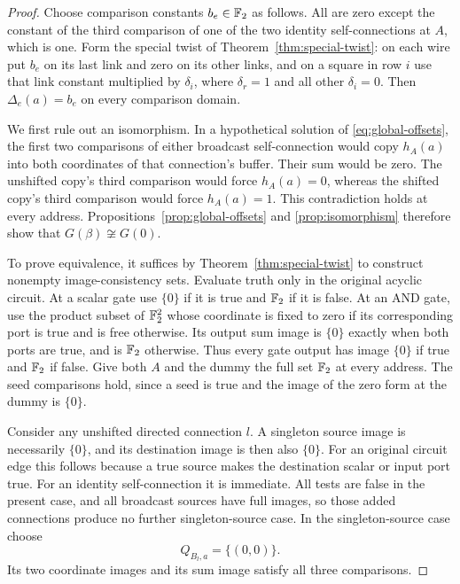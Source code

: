 \begin{proof}
Choose comparison constants \(b_e\in\mathbb F_2\) as follows.  All are zero except
the constant of the third comparison of one of the two identity
self-connections at \(A\), which is one.  Form the special twist of
Theorem~\ref{thm:special-twist}: on each wire put \(b_e\) on its last link
and zero on its other links, and on a square in row \(i\) use that link
constant multiplied by \(\delta_i\), where \(\delta_r=1\) and all other
\(\delta_i=0\).  Then \(\Delta_e(a)=b_e\) on every comparison domain.

We first rule out an isomorphism.  In a hypothetical solution of
\eqref{eq:global-offsets}, the first two comparisons of either broadcast
self-connection would copy \(h_A(a)\) into both coordinates of that
connection's buffer.  Their sum would be zero.  The unshifted copy's third
comparison would force \(h_A(a)=0\), whereas the shifted copy's third
comparison would force \(h_A(a)=1\).  This contradiction holds at every
address.  Propositions~\ref{prop:global-offsets} and
\ref{prop:isomorphism} therefore show that \(G(\beta)\not\cong G(0)\).

To prove equivalence, it suffices by Theorem~\ref{thm:special-twist} to
construct nonempty image-consistency sets.  Evaluate truth only in the
original acyclic circuit.  At a scalar gate use \(\{0\}\) if it is true
and \(\mathbb F_2\) if it is false.  At an AND gate, use the product subset of
\(\mathbb F_2^2\) whose coordinate is fixed to zero if its corresponding port is
true and is free otherwise.  Its output sum image is \(\{0\}\) exactly
when both ports are true, and is \(\mathbb F_2\) otherwise.  Thus every gate output
has image \(\{0\}\) if true and \(\mathbb F_2\) if false.  Give both \(A\) and
the dummy the full set \(\mathbb F_2\) at every address.  The seed comparisons
hold, since a seed is true and the image of the zero form at the dummy is
\(\{0\}\).

Consider any unshifted directed connection \(l\).  A singleton source image
is necessarily \(\{0\}\), and its destination image is then also
\(\{0\}\).  For an original circuit edge this follows because a true
source makes the destination scalar or input port true.  For an identity
self-connection it is immediate.  All tests are false in the present case,
and all broadcast sources have full images, so those added connections
produce no further singleton-source case.  In the singleton-source case
choose
\[
 Q_{B_l,a}=\{(0,0)\}.
\]
Its two coordinate images and its sum image satisfy all three comparisons.


\end{proof}
